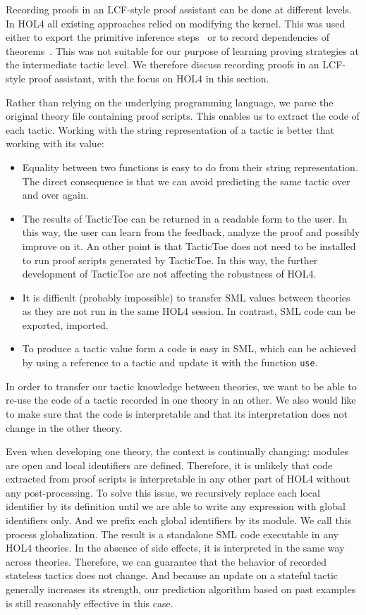 \documentclass[runningheads,a4paper,draft]{svjour3}
\def\holfour{\textsf{HOL4}\xspace}
\def\sml{\textsf{SML}\xspace}
\def\tactictoe{\textsf{TacticToe}\xspace}
\begin{document}
Recording proofs in an LCF-style proof assistant can be done at different
levels.
In \holfour all existing approaches relied on modifying the kernel. This was
used
either to export the primitive inference
steps~\cite{Wong95recordingand,DBLP:conf/itp/KumarH12}
or to record dependencies of theorems~\cite{tgck-cpp15}. This was not suitable
for our
purpose of learning proving strategies at the intermediate tactic level. We
therefore
discuss recording proofs in an LCF-style proof assistant, with the focus on
\holfour
in this section.

Rather than relying on the underlying programming language, we parse the
original theory file containing proof scripts. This enables us to extract the
code of each tactic.
Working with the string representation of a tactic is better that working with
its value:
\begin{itemize}
\item Equality between two functions is easy to do from
their string representation. The direct consequence is that we can avoid
predicting the same tactic over and over again.
\item
The
results of
\tactictoe can be returned in a readable form to the user. In this way, the
user can learn from the feedback, analyze the proof and possibly improve on it.
An other point is that \tactictoe does not need to be installed to run
proof scripts generated by \tactictoe. In this way, the further development of
\tactictoe are not affecting the robustness of \holfour.
\item
It is difficult (probably impossible) to transfer \sml values
between theories as they are not run in the same \holfour session. In contrast,
\sml code can be exported, imported.
\item To produce a tactic value form a code is easy in \sml, which can be
achieved by using a reference to a tactic and update it with the function
\texttt{use}.
\end{itemize}

In order to transfer our tactic knowledge between theories, we want to be able
to re-use the code of a tactic recorded in one theory in an
other. We also would like to make sure that the code is interpretable and that
its interpretation does not change in the other theory.

Even when developing one theory, the context is continually changing:
modules are open and local identifiers are defined. Therefore, it is unlikely
that code extracted from proof scripts is interpretable in any other part of
\holfour without any post-processing.
To solve this issue, we recursively replace each local identifier by its
definition until we are able to write any expression with global identifiers
only. And we prefix each global identifiers by its module.
We call this process globalization. The result is a standalone \sml code
executable in any \holfour theories.  In the absence of side effects, it is
interpreted in the same way across theories.
Therefore, we can guarantee that the behavior of recorded stateless tactics
does not change. And because an update on a stateful tactic
generally increases its strength, our prediction algorithm based on past
examples is still reasonably effective in this case.
\end{document}
